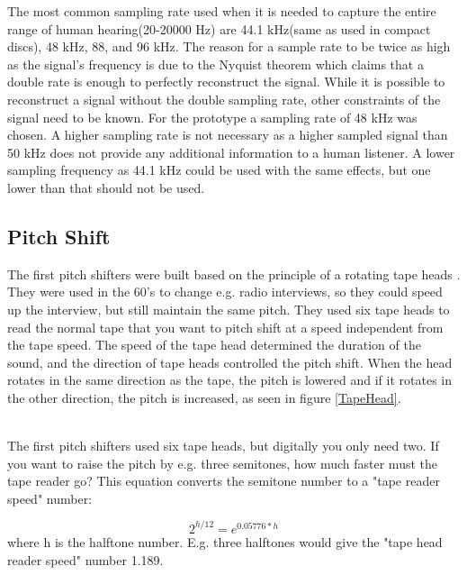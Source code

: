 The most common sampling rate used when it is needed to capture the entire range of human hearing(20-20000 Hz) are 44.1 kHz(same as used in compact discs), 48 kHz, 88, and 96 kHz. The reason for a sample rate to be twice as high as the signal’s frequency is due to the Nyquist theorem which claims that a double rate is enough to perfectly reconstruct the signal. While it is possible to reconstruct a signal without the double sampling rate, other constraints of the signal need to be known. For the prototype a sampling rate of 48 kHz was chosen. A higher sampling rate is not necessary as a higher sampled signal than 50 kHz does not provide any additional information to a human listener. A lower sampling frequency as 44.1 kHz could be used with the same effects, but one lower than that should not be used.

\subsection{Pitch Shift}

The first pitch shifters were built based on the principle of a rotating tape heads \citep{Katjaas_00}. They were used in the 60's to change e.g. radio interviews, so they could speed up the interview, but still maintain the same pitch. They used six tape heads to read the normal tape that you want to pitch shift at a speed independent from the tape speed. The speed of the tape head determined the duration of the sound, and the direction of tape heads controlled the pitch shift. When the head rotates in the same direction as the tape, the pitch is lowered and if it rotates in the other direction, the pitch is increased, as seen in figure \ref{TapeHead}. \\

\begin{minipage}{\linewidth}%
\label{TapeHead}
\end{minipage}\\

The first pitch shifters used six tape heads, but digitally you only need two. If you want to raise the pitch by e.g. three semitones, how much faster must the tape reader go?
This equation converts the semitone number to a "tape reader speed" number:

\[ 2^{h/12} = e^{0.05776*h} \] where h is the halftone number. E.g. three halftones would give the "tape head reader speed" number 1.189. \\

